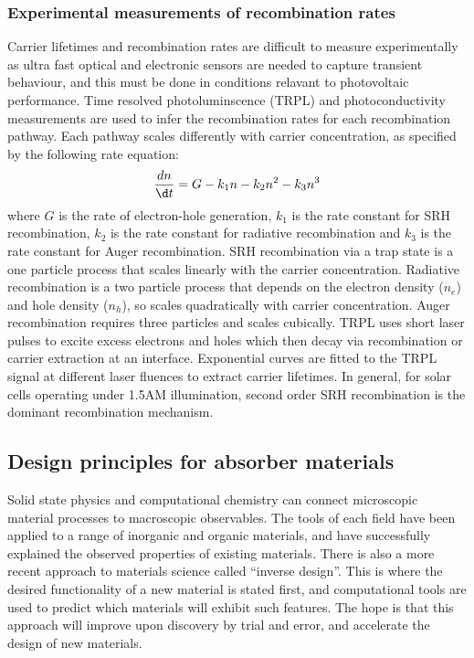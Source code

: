 \subsubsection{Experimental measurements of recombination rates} \label{exprecombo}

Carrier lifetimes and recombination rates are difficult to measure experimentally as ultra fast optical and electronic sensors are needed to capture transient behaviour, and this must be done in conditions relavant to photovoltaic performance. Time resolved photoluminscence (TRPL) and photoconductivity measurements are used to infer the recombination rates for each recombination pathway.
Each pathway scales differently with carrier concentration, as specified by the following rate equation:
\begin{equation}
\frac{d n}{\d t} = G -k_1n -k_2n^2 -k_3n^3 
\end{equation}
where $G$ is the rate of electron-hole generation, $k_1$ is the rate constant for SRH recombination, $k_2$ is the rate constant for radiative recombination and $k_3$ is the rate constant for Auger recombination. SRH recombination via a trap state is a one particle process that scales linearly with the carrier concentration. Radiative recombination is a two particle process that depends on the electron density ($n_e$) and hole density ($n_h$), so scales quadratically with carrier concentration. Auger recombination requires three particles and scales cubically.
TRPL uses short laser pulses to excite excess electrons and holes which then decay via recombination or carrier extraction at an interface. Exponential curves are fitted to the TRPL signal at different laser fluences to extract carrier lifetimes. In general, for solar cells operating under 1.5AM illumination, second order SRH recombination is the dominant recombination mechanism.
% 


 \subsection{Design principles for absorber materials}
 
Solid state physics and computational chemistry can connect microscopic material processes to macroscopic observables. The tools of each field have been applied to a range of inorganic and organic materials, and have successfully explained the observed properties of existing materials.
There is also a more recent approach to materials science called ``inverse design''. This is where the desired functionality of a new material is stated first, and computational tools are used to predict which materials will exhibit such features.\autocite{Zunger2018}
The hope is that this approach will improve upon discovery by trial and error, and accelerate the design of new materials.

